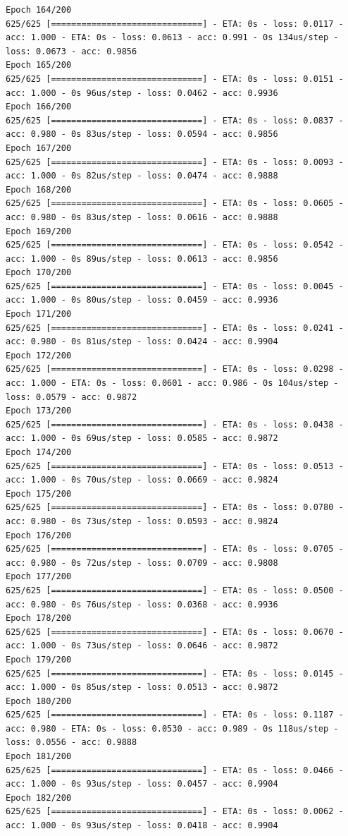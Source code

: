 \documentclass[11pt]{article}
\begin{document}
\begin{Verbatim}[commandchars=\\\{\}]
Epoch 164/200
625/625 [==============================] - ETA: 0s - loss: 0.0117 - acc: 1.000 - ETA: 0s - loss: 0.0613 - acc: 0.991 - 0s 134us/step - loss: 0.0673 - acc: 0.9856
Epoch 165/200
625/625 [==============================] - ETA: 0s - loss: 0.0151 - acc: 1.000 - 0s 96us/step - loss: 0.0462 - acc: 0.9936
Epoch 166/200
625/625 [==============================] - ETA: 0s - loss: 0.0837 - acc: 0.980 - 0s 83us/step - loss: 0.0594 - acc: 0.9856
Epoch 167/200
625/625 [==============================] - ETA: 0s - loss: 0.0093 - acc: 1.000 - 0s 82us/step - loss: 0.0474 - acc: 0.9888
Epoch 168/200
625/625 [==============================] - ETA: 0s - loss: 0.0605 - acc: 0.980 - 0s 83us/step - loss: 0.0616 - acc: 0.9888
Epoch 169/200
625/625 [==============================] - ETA: 0s - loss: 0.0542 - acc: 1.000 - 0s 89us/step - loss: 0.0613 - acc: 0.9856
Epoch 170/200
625/625 [==============================] - ETA: 0s - loss: 0.0045 - acc: 1.000 - 0s 80us/step - loss: 0.0459 - acc: 0.9936
Epoch 171/200
625/625 [==============================] - ETA: 0s - loss: 0.0241 - acc: 0.980 - 0s 81us/step - loss: 0.0424 - acc: 0.9904
Epoch 172/200
625/625 [==============================] - ETA: 0s - loss: 0.0298 - acc: 1.000 - ETA: 0s - loss: 0.0601 - acc: 0.986 - 0s 104us/step - loss: 0.0579 - acc: 0.9872
Epoch 173/200
625/625 [==============================] - ETA: 0s - loss: 0.0438 - acc: 1.000 - 0s 69us/step - loss: 0.0585 - acc: 0.9872
Epoch 174/200
625/625 [==============================] - ETA: 0s - loss: 0.0513 - acc: 1.000 - 0s 70us/step - loss: 0.0669 - acc: 0.9824
Epoch 175/200
625/625 [==============================] - ETA: 0s - loss: 0.0780 - acc: 0.980 - 0s 73us/step - loss: 0.0593 - acc: 0.9824
Epoch 176/200
625/625 [==============================] - ETA: 0s - loss: 0.0705 - acc: 0.980 - 0s 72us/step - loss: 0.0709 - acc: 0.9808
Epoch 177/200
625/625 [==============================] - ETA: 0s - loss: 0.0500 - acc: 0.980 - 0s 76us/step - loss: 0.0368 - acc: 0.9936
Epoch 178/200
625/625 [==============================] - ETA: 0s - loss: 0.0670 - acc: 1.000 - 0s 73us/step - loss: 0.0646 - acc: 0.9872
Epoch 179/200
625/625 [==============================] - ETA: 0s - loss: 0.0145 - acc: 1.000 - 0s 85us/step - loss: 0.0513 - acc: 0.9872
Epoch 180/200
625/625 [==============================] - ETA: 0s - loss: 0.1187 - acc: 0.980 - ETA: 0s - loss: 0.0530 - acc: 0.989 - 0s 118us/step - loss: 0.0556 - acc: 0.9888
Epoch 181/200
625/625 [==============================] - ETA: 0s - loss: 0.0466 - acc: 1.000 - 0s 93us/step - loss: 0.0457 - acc: 0.9904
Epoch 182/200
625/625 [==============================] - ETA: 0s - loss: 0.0062 - acc: 1.000 - 0s 93us/step - loss: 0.0418 - acc: 0.9904

\end{Verbatim}
\end{document}
